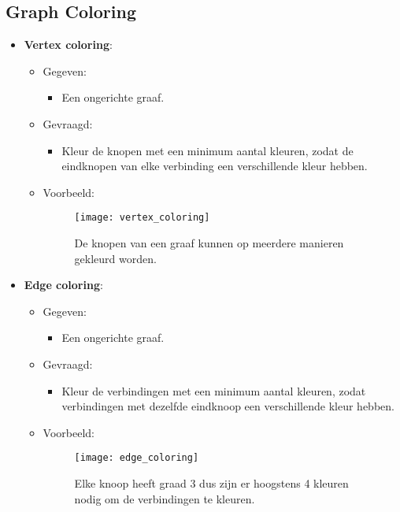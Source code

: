 \subsection{Graph Coloring}
\begin{itemize}
    \item \textbf{Vertex coloring}:
    \begin{itemize}
        \item Gegeven:
        \begin{itemize}
            \item Een ongerichte graaf.
        \end{itemize}
        \item Gevraagd:
        \begin{itemize}
            \item Kleur de knopen met een minimum aantal kleuren, zodat de eindknopen van elke verbinding een verschillende kleur hebben.
        \end{itemize}
        \item Voorbeeld:
        \begin{figure}[ht]
            \centering
            \texttt{[image: vertex\_coloring]}
            \caption{De knopen van een graaf kunnen op meerdere manieren gekleurd worden.}
            \label{fig:vertex_coloring}
        \end{figure}
    \end{itemize}

    \item \textbf{Edge coloring}:
    \begin{itemize}
        \item Gegeven:
        \begin{itemize}
            \item Een ongerichte graaf.
        \end{itemize}
        \item Gevraagd:
        \begin{itemize}
            \item Kleur de verbindingen met een minimum aantal kleuren, zodat verbindingen met dezelfde eindknoop een verschillende kleur hebben.
        \end{itemize}
        \item Voorbeeld:
        \begin{figure}[ht]
            \centering
            \texttt{[image: edge\_coloring]}
            \caption{Elke knoop heeft graad 3 dus zijn er hoogstens 4 kleuren nodig om de verbindingen te kleuren.}
            \label{fig:edge_coloring}
        \end{figure}
    \end{itemize}
    
\end{itemize}



